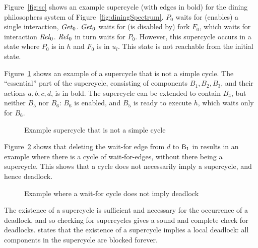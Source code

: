 \begin{figure*}[ht]
  \begin{center}
   \scalebox{0.4}{}
   \caption{Example supercycle for dining philosophers system of Figure~\ref{fig:diningSpectrum}.}
   \label{fig:sc}
  \end{center}
\end{figure*}


Figure~\ref{fig:sc} shows an example supercycle (with edges in bold) for the dining philosophers
system of Figure~\ref{fig:diningSpectrum}.
$P_0$ waits for (enables) a single interaction, $\mathit{Get}_0$. 
$\mathit{Get}_0$ waits for (is disabled by) fork $F_0$, which waits for interaction $\mathit{Rel}_0$.
$\mathit{Rel}_0$ in turn waits for $P_0$. However, this supercycle occurs in a state where $P_0$ is in $h$
and $F_0$ is in $u_l$. This state is not reachable from the initial state. 


Figure~\ref{fig:SCnotCycle} shows an example of a supercycle that is not a simple cycle. 
The ``essential'' part of the supercycle, consisting of components $B_1, B_2,B_3$, and their actions $a,b,c,d$, is in bold. 
The supercycle can be extended to contain $B_4$, but neither $B_5$ nor $B_6$: $B_6$ is enabled, and $B_5$ is ready to execute $h$, which waits
only for $B_6$.
%
\begin{figure}[ht]
\begin{center}
\scalebox{0.6}{}
\caption{Example supercycle that is not a simple cycle}
\label{fig:SCnotCycle}
\end{center}
\end{figure}
%
Figure~\ref{fig:cycleOK} shows that deleting the wait-for edge from $d$ to $\mathsf{B}_1$ in  results in 
an example where there is
a cycle of wait-for-edges, without there being a supercycle. This shows
that a cycle does not necessarily imply a supercycle, and hence
deadlock. 
%
\begin{figure}[ht]
\begin{center}
\scalebox{0.6}{}
\caption{Example where a wait-for cycle does not imply deadlock}
\label{fig:cycleOK}
\end{center}
\end{figure}


The existence of a supercycle is sufficient and necessary for the occurrence of
a deadlock, and so checking for supercycles gives a sound and complete check for
deadlocks.  
%
 states that the
existence of a supercycle implies a local deadlock: all components in
the supercycle are blocked forever.

